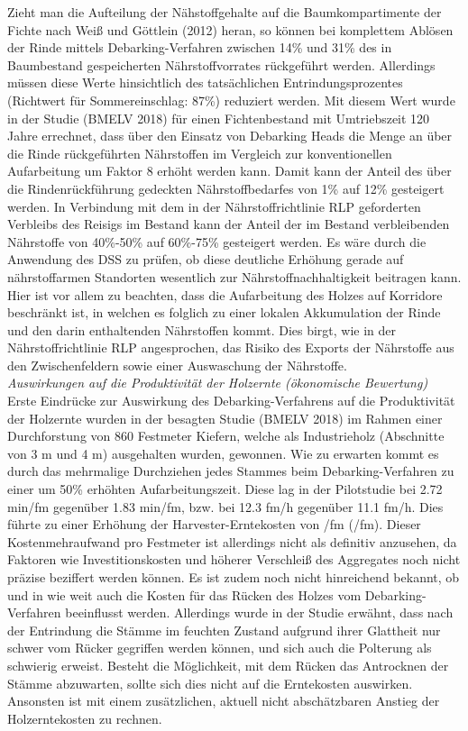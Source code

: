 \documentclass[a4paper, 11pt, titlepage]{scrartcl} %
\begin{document}
Zieht man die Aufteilung der Nähstoffgehalte auf die Baumkompartimente der Fichte nach Weiß und Göttlein (2012) heran, so können bei komplettem Ablösen der Rinde mittels Debarking-Verfahren zwischen 14\% und 31\% des in Baumbestand gespeicherten Nährstoffvorrates rückgeführt werden. Allerdings müssen diese Werte hinsichtlich des tatsächlichen Entrindungsprozentes (Richtwert für Sommereinschlag: 87\%) reduziert werden. Mit diesem Wert wurde in der Studie (BMELV 2018) für einen Fichtenbestand mit Umtriebszeit 120 Jahre errechnet, dass über den Einsatz von Debarking Heads die Menge an über die Rinde rückgeführten Nährstoffen im Vergleich zur konventionellen Aufarbeitung um Faktor 8 erhöht werden kann. Damit kann der Anteil des über die Rindenrückführung gedeckten Nährstoffbedarfes von 1\% auf 12\% gesteigert werden. In Verbindung mit dem in der Nährstoffrichtlinie RLP geforderten Verbleibs des Reisigs im Bestand kann der Anteil der im Bestand verbleibenden Nährstoffe von 40\%-50\% auf 60\%-75\% gesteigert werden. Es wäre durch die Anwendung des DSS zu prüfen, ob diese deutliche Erhöhung gerade auf nährstoffarmen Standorten wesentlich zur Nährstoffnachhaltigkeit beitragen kann. Hier ist vor allem zu beachten, dass die Aufarbeitung des Holzes auf Korridore beschränkt ist, in welchen es folglich zu einer lokalen Akkumulation der Rinde und den darin enthaltenden Nährstoffen kommt. Dies birgt, wie in der Nährstoffrichtlinie RLP angesprochen, das Risiko des Exports der Nährstoffe aus den Zwischenfeldern sowie einer Auswaschung der Nährstoffe.\\

\newpage
\noindent \textit{Auswirkungen auf die Produktivität der Holzernte (ökonomische Bewertung)}\\

Erste Eindrücke zur Auswirkung des Debarking-Verfahrens auf die Produktivität der Holzernte wurden in der besagten Studie (BMELV 2018) im Rahmen einer Durchforstung von 860 Festmeter Kiefern, welche als Industrieholz (Abschnitte von 3 m und 4 m) ausgehalten wurden, gewonnen. Wie zu erwarten kommt es durch das mehrmalige Durchziehen jedes Stammes beim Debarking-Verfahren zu einer um 50\% erhöhten Aufarbeitungszeit. Diese lag in der Pilotstudie bei 2.72 min/fm gegenüber 1.83 min/fm, bzw. bei 12.3 fm/h gegenüber 11.1 fm/h. Dies führte zu einer Erhöhung der Harvester-Erntekosten von /fm (/fm). Dieser Kostenmehraufwand pro Festmeter ist allerdings nicht als definitiv anzusehen, da Faktoren wie Investitionskosten und höherer Verschleiß des Aggregates noch nicht präzise beziffert werden können. Es ist zudem noch nicht hinreichend bekannt, ob und in wie weit auch die Kosten für das Rücken des Holzes vom Debarking-Verfahren beeinflusst werden. Allerdings wurde in der Studie erwähnt, dass nach der Entrindung die Stämme im feuchten Zustand aufgrund ihrer Glattheit nur schwer vom Rücker gegriffen werden können, und sich auch die Polterung als schwierig erweist. Besteht die Möglichkeit, mit dem Rücken das Antrocknen der Stämme abzuwarten, sollte sich dies nicht auf die Erntekosten auswirken. Ansonsten ist mit einem zusätzlichen, aktuell nicht abschätzbaren Anstieg der Holzerntekosten zu rechnen.\par
\end{document}
